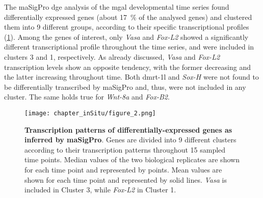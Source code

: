 The maSigPro \gls{dge} analysis of the \gls{mgal} developmental time series found  differentially expressed genes (about \qty{17}{\percent} of the analysed genes) and clustered them into 9 different groups, according to their specific transcriptional profiles (\cref{fig:masigpro}). Among the genes of interest, only \textit{Vasa} and \textit{Fox-L2} showed a significantly different transcriptional profile throughout the time series, and were included in clusters 3 and 1, respectively. As already discussed, \textit{Vasa} and \textit{Fox-L2} transcription levels show an opposite tendency, with the former decreasing and the latter increasing throughout time. Both \gls{dmrt-1l} and \textit{Sox-H} were not found to be differentially transcribed by maSigPro and, thus, were not included in any cluster. The same holds true for \textit{Wnt-8a} and \textit{Fox-B2}.

\begin{figure}[t!]
	\centering
	\texttt{[image: chapter\_inSitu/figure\_2.png]}
	\caption[\textbf{Transcription patterns of differentially-expressed genes as inferred by maSigPro}]
	{
		\textbf{Transcription patterns of differentially-expressed genes as inferred by maSigPro}. Genes are divided into 9 different clusters according to their transcription patterns throughout 15 sampled time points. Median values of the two biological replicates are shown for each time point and represented by points. Mean values are shown for each time point and represented by solid lines. \textit{Vasa} is included in Cluster 3, while \textit{Fox-L2} in Cluster 1.
	}
	\label{fig:masigpro}
\end{figure}

